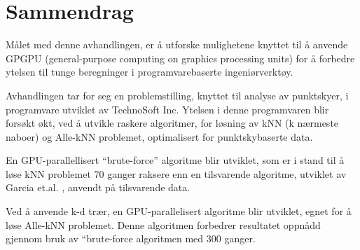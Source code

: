 
\section*{Sammendrag}


M{\aa}let med denne avhandlingen, er {\aa} utforske mulighetene knyttet til {\aa} anvende GPGPU (general-purpose computing on graphics processing units) for {\aa} forbedre ytelsen til tunge beregninger i programvarebaserte ingeni{\o}rverkt{\o}y.

Avhandlingen tar for seg en problemstilling, knyttet til analyse av punktskyer, i programvare utviklet av TechnoSoft Inc. Ytelsen i denne programvaren blir fors{\o}kt {\o}kt, ved {\aa} utvikle raskere algoritmer, for l{\o}sning av kNN (k n{\ae}rmeste naboer) og Alle-kNN problemet, optimalisert for punktskybaserte data.

En GPU-parallellisert “brute-force” algoritme blir utviklet, som er i stand til {\aa} l{\o}se kNN problemet $70$ ganger raksere enn en tilsvarende algoritme, utviklet av Garcia et.al. \cite{Garcia2008}, anvendt p{\aa} tilsvarende data.

Ved {\aa} anvende k-d tr{\ae}r, en GPU-parallelisert algoritme blir utviklet, egnet for {\aa} l{\o}se Alle-kNN problemet. Denne algoritmen forbedrer resultatet oppn{\aa}dd gjennom bruk av “brute-force algoritmen med 300 ganger.


\clearpage\
